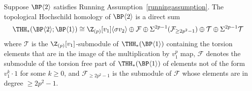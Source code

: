 \begin{theorem}\label{thm:main-v2}
Suppose $\BP\langle 2\rangle$ satisfies Running Assumption~\ref{runningassumption}. 
The topological Hochschild homology of $\BP\langle 2\rangle$ is a direct sum
  \[
    \THH_*(\BP \langle 2 \rangle ; \BP \langle 1 \rangle) \cong \Z_{(p)}[v_1] \langle \sigma v_2 \rangle \oplus \mathcal{F} \oplus \Sigma^{2p - 1} (\mathcal{F}_{\geq 2p^2 - 1}) \oplus \mathcal{T} \oplus \Sigma^{2p - 1} \mathcal{T}
  \]
  where $\mathcal{T}$ is the $\Z_{(p)}[v_1]$-submodule of $\THH_*(\BP \langle 1 \rangle)$ containing the torsion elements that are in the image of the multiplication by $v_1^p$ map,  $\mathcal{F}$ denotes the submodule of the torsion free part of $\THH_*(\BP \langle 1 \rangle)$ of elements not of the form $v_1^k \cdot 1$ for some $k \geq 0$, and $\mathcal{F}_{\geq 2p^2 -1}$ is the submodule of $\mathcal{F}$ whose elements are in degree $\geq 2p^2 -1$.
\end{theorem}


